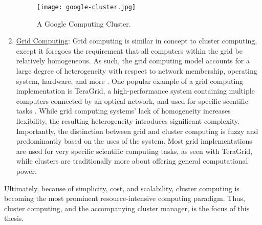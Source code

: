 \begin{enumerate}
    \begin{figure}[!h]
      \centerline{\texttt{[image: google-cluster.jpg]}}
      \caption{A Google Computing Cluster.\cite{image-google-cluster}}
    \end{figure}

  \item \underline{Grid Computing}: Grid computing is similar in concept to
    cluster computing, except it foregoes the requirement that all computers
    within the grid be relatively homogeneous. As such, the grid computing model accounts
    for a large degree of heterogeneity with respect to network membership,
    operating system, hardware, and more
    \cite{distributed-systems-principles-and-paradigms}. One popular example of a
    grid computing implementation is TeraGrid, a high-performance system
    containing multiple computers connected by an optical network, and used for
    specific scentific tasks \cite{building-the-teragrid}. While grid computing
    systems' lack of homogeneity increases flexibility,
    the resulting heterogeneity introduces significant complexity. Importantly,
    the distinction between grid and cluster computing is fuzzy and
    predominantly based on the uses of the system. Most grid implementations are
    used for very specific scientific computing tasks, as seen with TeraGrid,
    while clusters are traditionally more about offering general computational
    power.

\end{enumerate}

Ultimately, because of simplicity, cost, and scalability, cluster computing is
becoming the most prominent resource-intensive computing paradigm. Thus, cluster
computing, and the accompanying cluster manager, is the focus of this
thesis.


